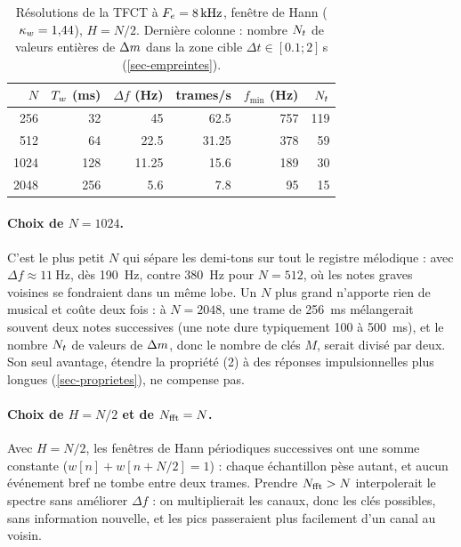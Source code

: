 \begin{table}[h]
  \centering\small
  \caption{Résolutions de la TFCT à $F_e = \qty{8}{\kilo\hertz}$, fenêtre de Hann
  ($\kappa_w = \num{1.44}$), $H = N/2$. Dernière colonne : nombre $N_t$ de valeurs entières de
  $\Delta m$ dans la zone cible $\Delta t \in [\num{0.1} ; 2]$\,s (\cref{sec-empreintes}).}
  \label{tab-resolutions}
  \begin{tabular}{@{}rrrrrr@{}}
    \toprule
    $N$ & $T_w$ (ms) & $\Delta f$ (Hz) & trames/s & $f_{\min}$ (Hz) & $N_t$ \\
    \midrule
    256  & 32  & 45          & \num{62.5}  & 757 & 119 \\
    512  & 64  & \num{22.5}  & \num{31.25} & 378 & 59 \\
    1024 & 128 & \num{11.25} & \num{15.6}  & 189 & 30 \\
    2048 & 256 & \num{5.6}   & \num{7.8}   & 95  & 15 \\
    \bottomrule
  \end{tabular}
\end{table}

\paragraph{Choix de $N = 1024$.} C'est le plus petit $N$ qui sépare les demi-tons sur tout
le registre mélodique : avec $\Delta f \approx \qty{11}{\hertz}$, dès \qty{190}{\hertz}, contre
\qty{380}{\hertz} pour $N = 512$, où les notes graves voisines se fondraient dans un même lobe.
Un $N$ plus grand n'apporte rien de musical et coûte deux fois : à $N = 2048$, une trame de
\qty{256}{\milli\second} mélangerait souvent deux notes successives (une note dure
typiquement 100 à \qty{500}{\milli\second}), et le nombre $N_t$ de valeurs de $\Delta m$, donc le
nombre de clés $M$, serait divisé par deux. Son seul avantage, étendre la propriété (2) à
des réponses impulsionnelles plus longues (\cref{sec-proprietes}), ne compense pas.

\paragraph{Choix de $H = N/2$ et de $N_{\mathrm{fft}} = N$.} Avec $H = N/2$, les fenêtres de Hann
périodiques successives ont une somme constante ($w[n] + w[n + N/2] = 1$) : chaque
échantillon pèse autant, et aucun événement bref ne tombe entre deux trames. Prendre
$N_{\mathrm{fft}} > N$ interpolerait le spectre sans améliorer $\Delta f$ : on multiplierait les canaux,
donc les clés possibles, sans information nouvelle, et les pics passeraient plus facilement
d'un canal au voisin.

